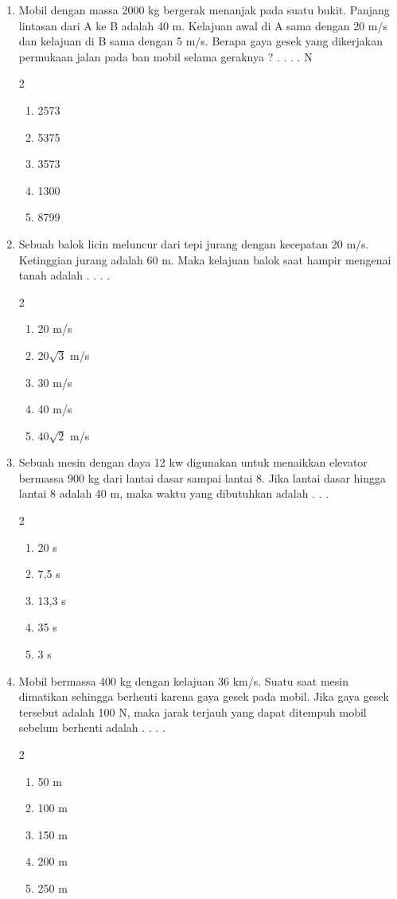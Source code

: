 \documentclass[11pt,a4paper]{article}
\newcommand{\pilgani}[1]{                            \vspace{-0.3cm}\begin{multicols}{2}
 \begin{enumerate}[label=\Alph*., itemsep=0pt,topsep=0pt,leftmargin=*,align=Center]#1                     \end{enumerate}
 \phantom{ini cuma sapi, wedus, dan ayam}
 \end{multicols}}
\begin{document}
\begin{enumerate}
\item Mobil dengan massa 2000 kg bergerak menanjak pada suatu bukit. Panjang lintasan dari A ke B adalah 40 m. Kelajuan awal di A sama dengan 20 m/s dan kelajuan di B sama dengan 5 m/s. Berapa gaya gesek yang dikerjakan permukaan jalan pada ban mobil selama geraknya ? .  . . . N
\pilgani{
	\item 2573
	\item 5375
	\item 3573
	\item 1300
	\item 8799
	} \vspace{2cm}
	
\item Sebuah balok licin meluncur dari tepi jurang dengan kecepatan 20 m/s. Ketinggian jurang adalah 60 m. Maka kelajuan balok saat hampir mengenai tanah adalah . . . . 
\pilgani{
	\item 20 m/s
	\item 20$\sqrt{3}$ m/s
	\item 30 m/s
	\item 40 m/s
	\item 40$\sqrt{2}$ m/s
	}\vspace{2cm}
	
\item Sebuah mesin dengan daya 12 kw digunakan untuk menaikkan elevator bermassa 900 kg dari lantai dasar sampai lantai 8. Jika lantai dasar hingga lantai 8 adalah 40 m, maka waktu yang dibutuhkan adalah . . . 
\pilgani{
	\item 20 s
	\item 7,5 s
	\item 13,3 s
	\item 35 s
	\item 3 s
	} \vspace{2cm}
	
	
	
\item Mobil bermassa 400 kg dengan kelajuan 36 km/s. Suatu saat mesin dimatikan sehingga berhenti karena gaya gesek pada mobil. Jika gaya gesek tersebut adalah 100 N, maka jarak terjauh yang dapat ditempuh mobil sebelum berhenti adalah . . . .
\pilgani{
	\item 50 m
	\item 100 m
	\item 150 m
	\item 200 m
	\item 250 m } \vspace{2cm}
	


\end{enumerate}
\end{document}

